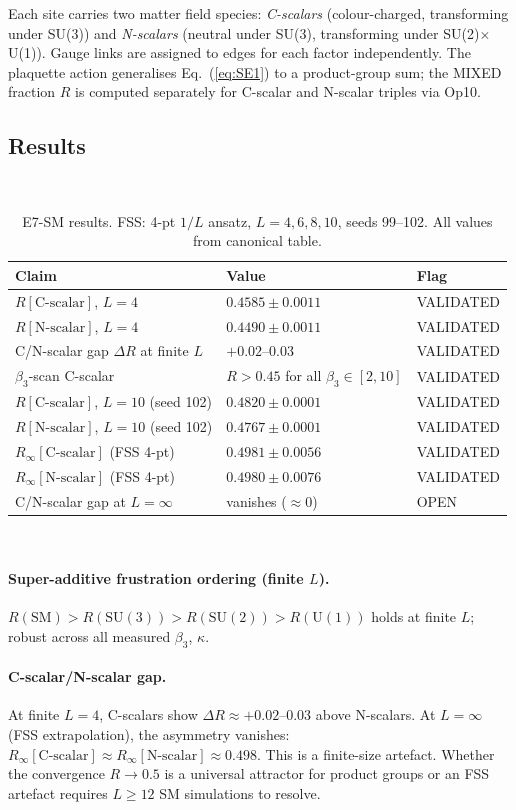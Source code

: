 \documentclass[12pt,a4paper]{article}
\theoremstyle{plain}
\theoremstyle{definition}
\theoremstyle{remark}
\newcommand{\RinfCscalar}{0.4981 \pm 0.0056}      %
\newcommand{\RinfNscalar}{0.4980 \pm 0.0076}      %
\begin{document}
Each site carries two matter field species:
\emph{C-scalars} (colour-charged, transforming under SU(3)) and
\emph{N-scalars} (neutral under SU(3), transforming under SU(2)$\times$U(1)).
Gauge links are assigned to edges for each factor independently.
The plaquette action generalises Eq.~(\ref{eq:SE1}) to a product-group sum;
the MIXED fraction $R$ is computed separately for C-scalar and N-scalar
triples via Op10.

\subsection{Results}

\begin{table}[htbp]
\caption{E7-SM results. FSS: 4-pt $1/L$ ansatz, $L=4,6,8,10$,
  seeds 99--102. All values from canonical table.}
\label{tab:SM}
\
\begin{tabular}{p{5.5cm}ll}
\toprule
Claim & Value & Flag \\
\midrule
$R[\text{C-scalar}]$, $L=4$ & $0.4585\pm0.0011$ & VALIDATED \\
$R[\text{N-scalar}]$, $L=4$ & $0.4490\pm0.0011$ & VALIDATED \\
C/N-scalar gap $\Delta R$ at finite $L$ & $+0.02$--$0.03$ & VALIDATED \\
$\beta_3$-scan C-scalar & $R>0.45$ for all $\beta_3\in[2,10]$ & VALIDATED \\
$R[\text{C-scalar}]$, $L=10$ (seed 102) & $0.4820\pm0.0001$ & VALIDATED \\
$R[\text{N-scalar}]$, $L=10$ (seed 102) & $0.4767\pm0.0001$ & VALIDATED \\
$R_\infty[\text{C-scalar}]$ (FSS 4-pt) & $\RinfCscalar$ & VALIDATED \\
$R_\infty[\text{N-scalar}]$ (FSS 4-pt) & $\RinfNscalar$ & VALIDATED \\
C/N-scalar gap at $L=\infty$ & vanishes ($\approx 0$) & OPEN \\
\bottomrule
\end{tabular}
\
\end{table}

\paragraph{Super-additive frustration ordering (finite $L$).}
$R(\mathrm{SM}) > R(\mathrm{SU}(3)) > R(\mathrm{SU}(2)) > R(\mathrm{U}(1))$
holds at finite $L$; robust across all measured $\beta_3$, $\kappa$.

\paragraph{C-scalar/N-scalar gap.}
At finite $L=4$, C-scalars show $\Delta R \approx+0.02$--$0.03$ above
N-scalars.
At $L=\infty$ (FSS extrapolation), the asymmetry vanishes:
$R_\infty[\text{C-scalar}] \approx R_\infty[\text{N-scalar}] \approx 0.498$.
This is a finite-size artefact.
Whether the convergence $R\to 0.5$ is a universal attractor for product
groups or an FSS artefact requires $L\geq 12$ SM simulations to resolve.
\end{document}
